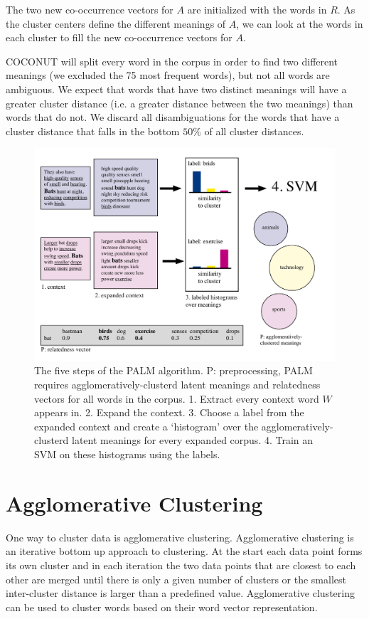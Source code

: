 \documentclass[11pt]{article}
\begin{document}
The two new co-occurrence vectors for $A$ are initialized with the words in $R$. As the cluster centers define the different meanings of $A$, we can look at the words in each cluster to fill the new co-occurrence vectors for $A$.  

COCONUT will split every word in the corpus in order to find two different meanings (we excluded the 75 most frequent words), but not all words are ambiguous. We expect that words that have two distinct meanings will have a greater cluster distance (i.e. a greater distance between the two meanings) than words that do not. We discard all disambiguations for the words that have a cluster distance that falls in the bottom $50\%$ of all cluster distances.
\begin{figure}
\center
\includegraphics[scale=0.75]{images/palm.pdf}
\caption{The five steps of the PALM algorithm. P: preprocessing, PALM requires agglomeratively-clusterd latent meanings and relatedness vectors for all words in the corpus. 1. Extract every context word $W$ appears in. 2. Expand the context. 3. Choose a label from the expanded context and create a `histogram' over the agglomeratively-clusterd latent meanings for every expanded corpus. 4. Train an SVM on these histograms using the labels.}
\label{palmimg}
\end{figure}

\section{Agglomerative Clustering}
One way to cluster data is agglomerative clustering. Agglomerative clustering is an iterative bottom up approach to clustering. At the start each data point forms its own cluster and in each iteration the two data points that are closest to each other are merged until there is only a given number of clusters or the smallest inter-cluster distance is larger than a predefined value. Agglomerative clustering can be used to cluster words based on their word vector representation. 
\end{document}
